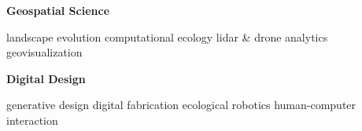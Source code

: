 \documentclass[10pt]{developercv} %
\begin{document}
\vspace{24pt}



%				

\begin{minipage}[t]{0.2\textwidth}
\textbf{Geospatial Science}
\end{minipage}
\begin{minipage}[t]{0.8\textwidth}
landscape evolution \textbullet{}
computational ecology \textbullet{}
lidar \& drone analytics \textbullet{}
geovisualization\\
\end{minipage}

\begin{minipage}[t]{0.2\textwidth}
\textbf{Digital Design}
\end{minipage}
\begin{minipage}[t]{0.8\textwidth}
generative design \textbullet{}
digital fabrication \textbullet{}
ecological robotics \textbullet{}
human-computer interaction\\
\end{minipage}



\end{document}
